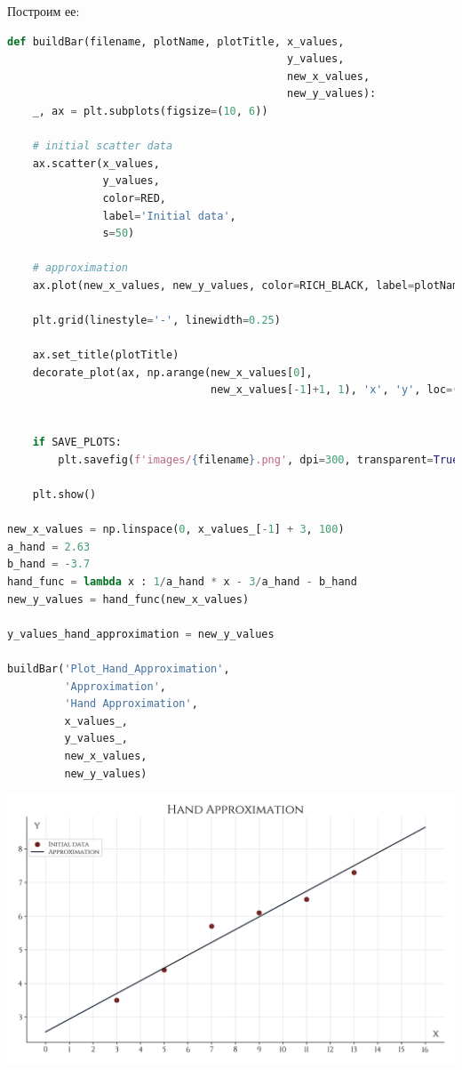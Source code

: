 \documentclass[a4paper, 14pt]{extarticle}
\begin{document}
Построим ее:

\newpage\vfill\null\null

\begin{center}
    \begin{lstlisting}[language=Python]
def buildBar(filename, plotName, plotTitle, x_values, 
                                            y_values, 
                                            new_x_values, 
                                            new_y_values):
    _, ax = plt.subplots(figsize=(10, 6))

    # initial scatter data
    ax.scatter(x_values, 
               y_values, 
               color=RED,
               label='Initial data',
               s=50)

    # approximation
    ax.plot(new_x_values, new_y_values, color=RICH_BLACK, label=plotName)

    plt.grid(linestyle='-', linewidth=0.25)

    ax.set_title(plotTitle)
    decorate_plot(ax, np.arange(new_x_values[0], 
                                new_x_values[-1]+1, 1), 'x', 'y', loc=(0.005, 
                                                                       0.825))
    
    if SAVE_PLOTS:
        plt.savefig(f'images/{filename}.png', dpi=300, transparent=True)

    plt.show()

new_x_values = np.linspace(0, x_values_[-1] + 3, 100)
a_hand = 2.63
b_hand = -3.7
hand_func = lambda x : 1/a_hand * x - 3/a_hand - b_hand
new_y_values = hand_func(new_x_values)

y_values_hand_approximation = new_y_values

buildBar('Plot_Hand_Approximation', 
         'Approximation', 
         'Hand Approximation', 
         x_values_, 
         y_values_, 
         new_x_values, 
         new_y_values)
    \end{lstlisting}
\end{center}

\vfill\newpage

\begin{center}
    \includegraphics[width=1\textwidth, height=0.5\textheight, keepaspectratio]{Plot_Hand_Approximation} \\
\end{center}
\end{document}
